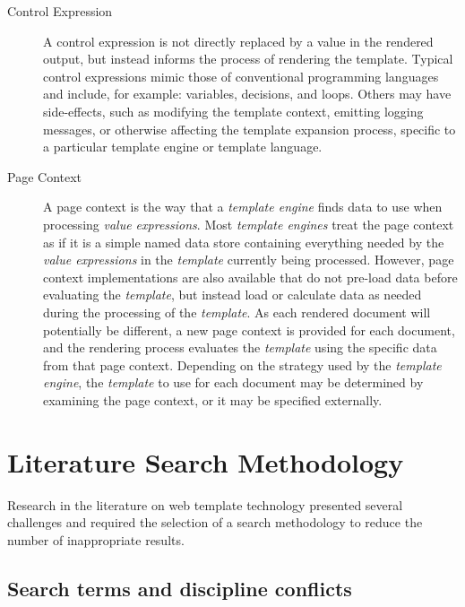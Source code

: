\begin{description}
\item[Control Expression] 
\label{A113}
A control expression is not directly replaced by a value in the rendered output, but instead informs the process of rendering the template. Typical control expressions mimic those of conventional \gls{programming language}s and include, for example: variables, decisions, and loops. Others may have \gls{side-effects}, such as modifying the template context, emitting logging messages, or otherwise affecting the template expansion process, specific to a particular \gls{template engine} or \gls{template language}.

\item[Page Context] 

A page context is the way that a \emph{\gls{template engine}} finds data to use when processing \emph{value expressions}. Most \emph{\gls{template engine}s} treat the page context as if it is a simple named data store containing everything needed by the \emph{value expressions} in the \emph{template} currently being processed. However, page context implementations are also available that do not pre-load data before evaluating the \emph{template}, but instead load or calculate data as needed during the processing of the \emph{template}. As each rendered document will potentially be different, a new page context is provided for each document, and the rendering process evaluates the \emph{template} using the specific data from that page context. Depending on the strategy used by the \emph{\gls{template engine}}, the \emph{template} to use for each document may be determined by examining the page context, or it may be specified externally.

\end{description}


\section{Literature Search Methodology}
\label{literature:methodology}

Research in the literature on web template technology presented several challenges and required the selection of a search methodology to reduce the number of inappropriate results.

\subsection{Search terms and discipline conflicts}
\label{literature:overlap}

